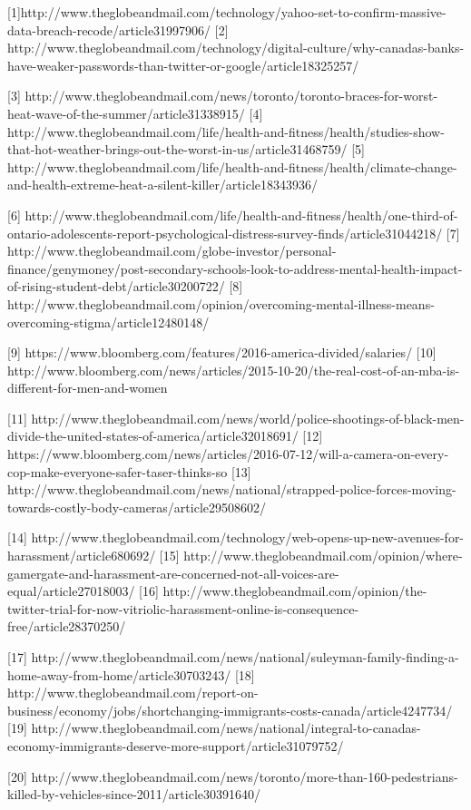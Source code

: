 \documentclass{article}
\begin{document}



[1]http://www.theglobeandmail.com/technology/yahoo-set-to-confirm-massive-data-breach-recode/article31997906/
[2] http://www.theglobeandmail.com/technology/digital-culture/why-canadas-banks-have-weaker-passwords-than-twitter-or-google/article18325257/

[3] http://www.theglobeandmail.com/news/toronto/toronto-braces-for-worst-heat-wave-of-the-summer/article31338915/
[4] http://www.theglobeandmail.com/life/health-and-fitness/health/studies-show-that-hot-weather-brings-out-the-worst-in-us/article31468759/
[5] http://www.theglobeandmail.com/life/health-and-fitness/health/climate-change-and-health-extreme-heat-a-silent-killer/article18343936/

[6] http://www.theglobeandmail.com/life/health-and-fitness/health/one-third-of-ontario-adolescents-report-psychological-distress-survey-finds/article31044218/
[7] http://www.theglobeandmail.com/globe-investor/personal-finance/genymoney/post-secondary-schools-look-to-address-mental-health-impact-of-rising-student-debt/article30200722/
[8] http://www.theglobeandmail.com/opinion/overcoming-mental-illness-means-overcoming-stigma/article12480148/

[9] https://www.bloomberg.com/features/2016-america-divided/salaries/
[10] http://www.bloomberg.com/news/articles/2015-10-20/the-real-cost-of-an-mba-is-different-for-men-and-women

[11] http://www.theglobeandmail.com/news/world/police-shootings-of-black-men-divide-the-united-states-of-america/article32018691/
[12] https://www.bloomberg.com/news/articles/2016-07-12/will-a-camera-on-every-cop-make-everyone-safer-taser-thinks-so
[13] http://www.theglobeandmail.com/news/national/strapped-police-forces-moving-towards-costly-body-cameras/article29508602/

[14] http://www.theglobeandmail.com/technology/web-opens-up-new-avenues-for-harassment/article680692/
[15] http://www.theglobeandmail.com/opinion/where-gamergate-and-harassment-are-concerned-not-all-voices-are-equal/article27018003/
[16] http://www.theglobeandmail.com/opinion/the-twitter-trial-for-now-vitriolic-harassment-online-is-consequence-free/article28370250/

[17] http://www.theglobeandmail.com/news/national/suleyman-family-finding-a-home-away-from-home/article30703243/
[18] http://www.theglobeandmail.com/report-on-business/economy/jobs/shortchanging-immigrants-costs-canada/article4247734/
[19] http://www.theglobeandmail.com/news/national/integral-to-canadas-economy-immigrants-deserve-more-support/article31079752/

[20] http://www.theglobeandmail.com/news/toronto/more-than-160-pedestrians-killed-by-vehicles-since-2011/article30391640/
\end{document}
